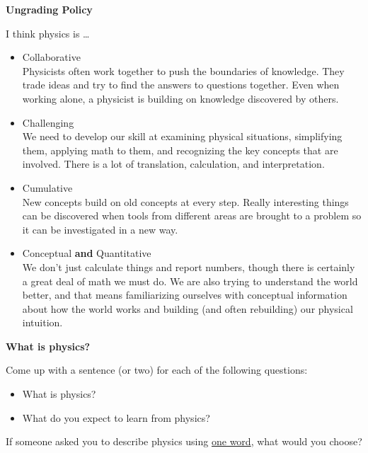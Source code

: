 \documentclass[]{article}
\begin{document}
\newpage
\begin{TeacherMargin}

\end{TeacherMargin}
\begin{PresentSpace}
\begin{center}
	\textbf{Ungrading Policy}
\end{center}
\end{PresentSpace}
\newpage
\begin{TeacherMargin}
\noindent I think physics is \dots
\begin{itemize}
	\item Collaborative \\ Physicists often work together to push the boundaries of knowledge. They trade ideas and try to find the answers to questions together. Even when working alone, a physicist is building on knowledge discovered by others.
	\item Challenging \\ We need to develop our skill at examining physical situations, simplifying them, applying math to them, and recognizing the key concepts that are involved. There is a lot of translation, calculation, and interpretation.
	\item Cumulative \\ New concepts build on old concepts at every step. Really interesting things can be discovered when tools from different areas are brought to a problem so it can be investigated in a new way.
	\item Conceptual \textbf{and} Quantitative \\ We don't just calculate things and report numbers, though there is certainly a great deal of math we must do. We are also trying to understand the world better, and that means familiarizing ourselves with conceptual information about how the world works and building (and often rebuilding) our physical intuition.
\end{itemize}
\end{TeacherMargin}
\begin{PresentSpace}
\begin{center}
	\textbf{What is physics?}
\end{center}
Come up with a sentence (or two) for each of the following questions:
\begin{itemize}
	\item What is physics?
	\item What do you expect to learn from physics?
\end{itemize}
If someone asked you to describe physics using \underline{one word}, what would you choose?
\end{PresentSpace}
\end{document}
